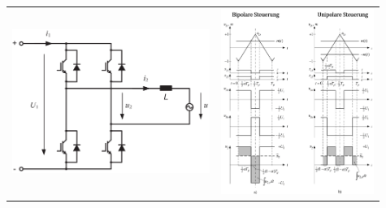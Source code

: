 \documentclass[10pt,landscape]{scrartcl}
\begin{document}
\begin{multicols}{2}
\begin{tabular}{b{0.51\linewidth} b{0.4\linewidth}}
  \includegraphics[width=0.8\linewidth]{img/sch_fullbridge.png}%

  &
  \includegraphics[width=\linewidth]{img/dcac/mod.png}%
\end{tabular}
  


\end{multicols}
\end{document}
